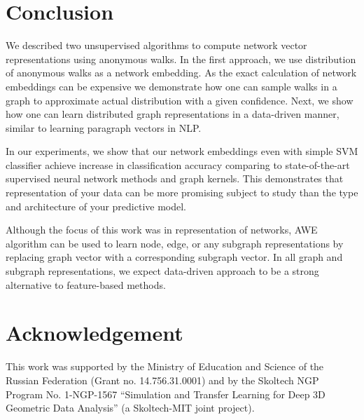 \documentclass{article}
\theoremstyle{definition}
\begin{document}
\section{Conclusion}
We described two unsupervised algorithms to compute network vector representations using anonymous walks. In the first approach, we use distribution of anonymous walks as a network embedding. As the exact calculation of network embeddings can be expensive we demonstrate how one can sample walks in a graph to approximate actual distribution with a given confidence. Next, we show how one can learn distributed graph representations in a data-driven manner, similar to learning paragraph vectors in NLP. 

In our experiments, we show that our network embeddings even with simple SVM classifier achieve increase in classification accuracy comparing to state-of-the-art supervised neural network methods and graph kernels. This demonstrates that representation of your data can be more promising subject to study than the type and architecture of your predictive model. 

Although the focus of this work was in representation of networks, AWE algorithm can be used to learn node, edge, or any subgraph representations by replacing graph vector with a corresponding subgraph vector. In all graph and subgraph representations, we expect data-driven approach to be a strong alternative to feature-based methods. 

\section{Acknowledgement}
This work was supported by the Ministry of Education and Science of the Russian Federation (Grant no. 14.756.31.0001) and by the Skoltech NGP Program No. 1-NGP-1567 “Simulation and Transfer Learning for Deep 3D Geometric Data Analysis” (a Skoltech-MIT joint project).



\end{document}
